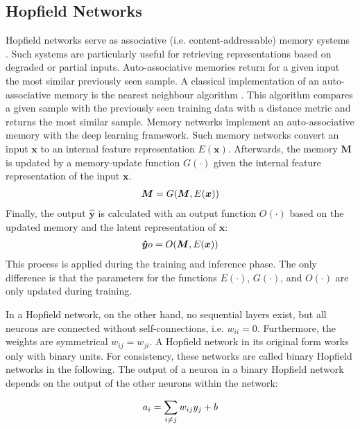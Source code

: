 \subsection{Hopfield Networks}
Hopfield networks serve as associative (i.e. content-addressable) memory systems .
Such systems are particularly useful for retrieving representations based on degraded or partial inputs.
Auto-associative memories return for a given input the most similar previously seen sample.
A classical implementation of an auto-associative memory is the nearest neighbour algorithm .
This algorithm compares a given sample with the previously seen training data with a distance metric and returns the most similar sample.
Memory networks  implement an auto-associative memory with the deep learning framework.
Such memory networks convert an input \(\boldsymbol{x}\) to an internal feature representation \(E(\boldsymbol{x})\). Afterwards, the memory $\boldsymbol{M}$ is updated by a memory-update function $G(\cdot)$ given the internal feature representation of the input \(\boldsymbol{x}\).
%
\begin{align}\eqlbl{hf_0}
	\boldsymbol{M}=G(\boldsymbol{M}, E(\boldsymbol{x}))
\end{align}
%
Finally, the output $\boldsymbol{\hat{y}}$ is calculated with an output function $O(\cdot)$ based on the updated memory and the latent representation of \(\boldsymbol{x}\):
%
\begin{align}\eqlbl{hf_00}
	\boldsymbol{\hat{y}}o=O(\boldsymbol{M}, E(\boldsymbol{x}))
\end{align}
%
This process is applied during the training and inference phase.
The only difference is that the parameters for the functions \(E(\cdot)\), \(G(\cdot)\), and \(O(\cdot)\) are only updated during training.

In a Hopfield network, on the other hand, no sequential layers exist, but all neurons are connected without self-connections, i.e. \(w_{ii}=0\).
Furthermore, the weights are symmetrical \(w_{ij} = w_{ji}\).
A Hopfield network in its original form works only with binary units.
For consistency, these networks are called binary Hopfield networks in the following.
The output of a neuron in a binary Hopfield network depends on the output of the other neurons within the network:

\begin{align}\eqlbl{hf_1}
	a_i = \sum_{i \neq j} w_{ij} y_j + b
\end{align}

